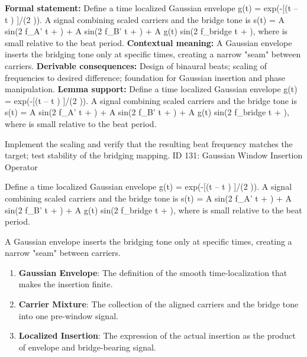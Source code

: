 \begingroup\footnotesize\setlength{\emergencystretch}{3em}\sloppy
\textbf{Formal statement:} Define a time localized Gaussian envelope g(t) = exp(-[(t -- t ) ]/(2   )). A signal combining scaled carriers and the bridge tone is s(t) = A  sin(2  f\_A' t +   ) + A  sin(2  f\_B' t +   ) + A  g(t) sin(2  f\_bridge t +   ), where   is small relative to the beat period.
\textbf{Contextual meaning:} A Gaussian envelope inserts the bridging tone only at specific times, creating a narrow "seam" between carriers.
\textbf{Derivable consequences:} Design of binaural beats; scaling of frequencies to desired difference; foundation for Gaussian insertion and phase manipulation.
\textbf{Lemma support:} Define a time localized Gaussian envelope g(t) = exp(-[(t -- t ) ]/(2   )). A signal combining scaled carriers and the bridge tone is s(t) = A  sin(2  f\_A' t +   ) + A  sin(2  f\_B' t +   ) + A  g(t) sin(2  f\_bridge t +   ), where   is small relative to the beat period.\par
\endgroup

Implement the scaling and verify that the resulting beat frequency matches the target; test stability of the bridging mapping. ID 131: Gaussian Window Insertion Operator

Define a time localized Gaussian envelope g(t) = exp(-[(t -- t ) ]/(2   )). A signal combining scaled carriers and the bridge tone is s(t) = A  sin(2  f\_A' t +   ) + A  sin(2  f\_B' t +   ) + A  g(t) sin(2  f\_bridge t +   ), where   is small relative to the beat period.

A Gaussian envelope inserts the bridging tone only at specific times, creating a narrow "seam" between carriers.
\endgroup

\begin{enumerate}[leftmargin=1.6em,itemsep=6pt,topsep=4pt]
\item \textbf{Gaussian Envelope}: The definition of the smooth time-localization that makes the insertion finite.
\item \textbf{Carrier Mixture}: The collection of the aligned carriers and the bridge tone into one pre-window signal.
\item \textbf{Localized Insertion}: The expression of the actual insertion as the product of envelope and bridge-bearing signal.
\end{enumerate}

